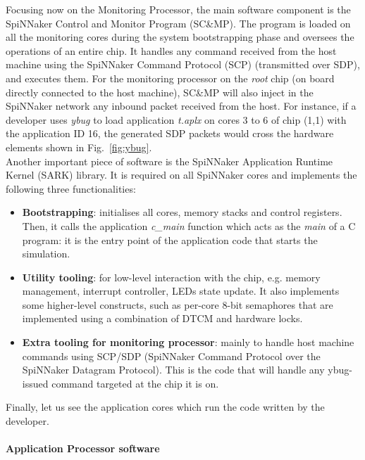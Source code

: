Focusing now on the Monitoring Processor, the main software component is the SpiNNaker Control and Monitor Program (SC\&MP). The program is loaded on all the monitoring cores during the system bootstrapping phase and oversees the operations of an entire chip. It handles any command received from the host machine using the SpiNNaker Command Protocol (SCP) \cite{ws6} (transmitted over SDP), and executes them. For the monitoring processor on the \textit{root} chip (on board directly connected to the host machine), SC\&MP will also inject in the SpiNNaker network any inbound packet received from the host. For instance, if a developer uses \textit{ybug} to load application \textit{t.aplx} on cores 3 to 6 of chip (1,1) with the application ID 16, the generated SDP packets would cross the hardware elements shown in Fig.~\ref{fig:ybug}. \\

Another important piece of software is the SpiNNaker Application Runtime Kernel (SARK) \cite{sark} library. It is required on all SpiNNaker cores and implements the following three functionalities:

\begin{itemize}
\item \textbf{Bootstrapping}: initialises all cores, memory stacks and control registers. Then, it calls the application \textit{c\_main} function which acts as the \textit{main} of a C program: it is the entry point of the application code that starts the simulation.

\item \textbf{Utility tooling}: for low-level interaction with the chip, e.g. memory management, interrupt controller, LEDs state update. It also implements some higher-level constructs, such as per-core 8-bit semaphores that are implemented using a combination of DTCM and hardware locks.

\item \textbf{Extra tooling for monitoring processor}: mainly to handle host machine commands using SCP/SDP (SpiNNaker Command Protocol over the SpiNNaker Datagram Protocol). This is the code that will handle any ybug-issued command targeted at the chip it is on.
\end{itemize}

Finally, let us see the application cores which run the code written by the developer.

\paragraph{Application Processor software}

